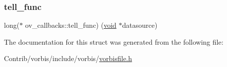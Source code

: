 \subsubsection{\texorpdfstring{tell\+\_\+func}{tell\_func}}
{\footnotesize\ttfamily long($\ast$ ov\+\_\+callbacks\+::tell\+\_\+func) (\mbox{\hyperlink{_s_d_l__opengles2__gl2ext_8h_ae5d8fa23ad07c48bb609509eae494c95}{void}} $\ast$datasource)}



The documentation for this struct was generated from the following file\+:\begin{DoxyCompactItemize}
\item 
Contrib/vorbis/include/vorbis/\mbox{\hyperlink{vorbisfile_8h}{vorbisfile.\+h}}\end{DoxyCompactItemize}
